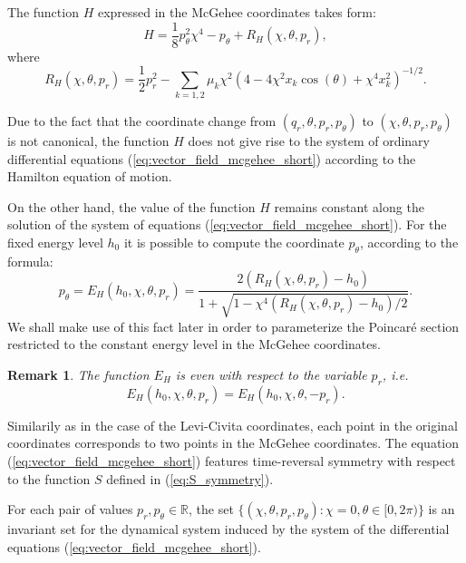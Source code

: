 \documentclass[1p]{article}
\newtheorem{remark}{Remark}
\begin{document}
The function $H$ expressed in the McGehee coordinates takes form:
\begin{equation}
\label{eq:Hamiltonian_in_McGehee_coordinates}
    H = \frac{1}{8} p_\theta^2 \chi^4 - p_\theta + R_H \left( \chi, \theta, p_r \right),
\end{equation}
where
\[
    R_H \left( \chi, \theta, p_r \right) = \frac{1}{2} p_r^2 - \sum_{k=1,2} \mu_k \chi^2 \left( 4 - 4 \chi^2 x_k  \cos(\theta) + \chi^4 x_k^2 \right)^{-1/2}.
\]

Due to the fact that the coordinate change from $(q_r, \theta, p_r, p_\theta)$ to $(\chi, \theta, p_r, p_\theta)$ is not canonical, the function $H$ does not give rise to the system of ordinary differential equations (\ref{eq:vector_field_mcgehee_short}) according to the Hamilton equation of motion.

On the other hand, the value of the function $H$ remains constant along the solution of the system of equations (\ref{eq:vector_field_mcgehee_short}). For the fixed energy level $h_0$ it is possible to compute the coordinate $p_\theta$, according to the formula:
\begin{equation}
    \label{eq:E_H_solution}
    p_\theta = E_H (h_0, \chi, \theta, p_r) = \frac{2\left(R_H \left( \chi, \theta, p_r \right)- h_0 \right)}{ 1 + \sqrt{ 1 - \chi^4 \left(R_H \left( \chi, \theta, p_r \right) - h_0 \right) / 2 } }.
\end{equation}
We shall make use of this fact later in order to parameterize the Poincar\'e section restricted to the constant energy level in the McGehee coordinates.

\begin{remark}
    \label{rem:E_H_even}
    The function $E_H$ is even with respect to the variable $p_r$, i.e.
    \[
        E_H (h_0, \chi, \theta, p_r) = E_H (h_0, \chi, \theta, -p_r).
    \]
\end{remark}

Similarily as in the case of the Levi-Civita coordinates, each point in the original coordinates corresponds to two points in the McGehee coordinates. The equation (\ref{eq:vector_field_mcgehee_short}) features time-reversal symmetry with respect to the function $S$ defined in (\ref{eq:S_symmetry}).

For each pair of values $p_r, p_\theta \in \mathbb{R}$, the set $\{ (\chi, \theta, p_r, p_\theta) : \chi = 0, \theta \in [0, 2\pi) \}$ is an invariant set for the dynamical system induced by the system of the differential equations (\ref{eq:vector_field_mcgehee_short}).
\end{document}
